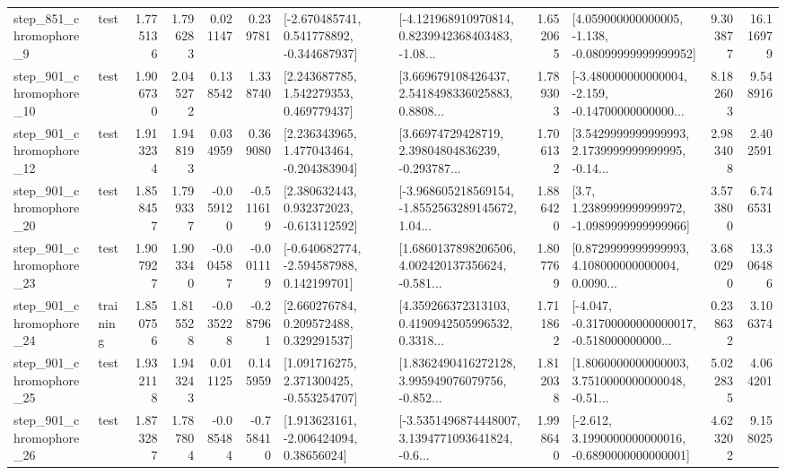 \begin{tabular}{llrrrrllrlrr}
   step\_851\_chromophore\_9 &      test &      1.775136 &    1.796283 &      0.021147 &  0.239781 &   [-2.670485741, 0.541778892, -0.344687937] &  [-4.121968910970814, 0.8239942368403483, -1.08... &       1.652065 &  [4.059000000000005, -1.138, -0.08099999999999952] &            9.303877 &         16.116979 \\
  step\_901\_chromophore\_10 &      test &      1.906730 &    2.045272 &      0.138542 &  1.338740 &     [2.243687785, 1.542279353, 0.469779437] &  [3.669679108426437, 2.5418498336025883, 0.8808... &       1.789303 &  [-3.480000000000004, -2.159, -0.14700000000000... &            8.182603 &          9.548916 \\
  step\_901\_chromophore\_12 &      test &      1.913234 &    1.948193 &      0.034959 &  0.369080 &    [2.236343965, 1.477043464, -0.204383904] &  [3.66974729428719, 2.39804804836239, -0.293787... &       1.706132 &  [3.5429999999999993, 2.1739999999999995, -0.14... &            2.983408 &          2.402591 \\
  step\_901\_chromophore\_20 &      test &      1.858457 &    1.799337 &     -0.059120 & -0.511619 &    [2.380632443, 0.932372023, -0.613112592] &  [-3.968605218569154, -1.8552563289145672, 1.04... &       1.886420 &     [3.7, 1.2389999999999972, -1.0989999999999966] &            3.573800 &          6.746531 \\
  step\_901\_chromophore\_23 &      test &      1.907927 &    1.903340 &     -0.004587 & -0.001119 &   [-0.640682774, -2.594587988, 0.142199701] &  [1.6860137898206506, 4.002420137356624, -0.581... &       1.807769 &  [0.8729999999999993, 4.108000000000004, 0.0090... &            3.680290 &         13.306486 \\
  step\_901\_chromophore\_24 &  training &      1.850756 &    1.815528 &     -0.035228 & -0.287961 &     [2.660276784, 0.209572488, 0.329291537] &  [4.359266372313103, 0.4190942505996532, 0.3318... &       1.711862 &  [-4.047, -0.31700000000000017, -0.518000000000... &            0.238632 &          3.106374 \\
  step\_901\_chromophore\_25 &      test &      1.932118 &    1.943243 &      0.011125 &  0.145959 &    [1.091716275, 2.371300425, -0.553254707] &  [1.8362490416272128, 3.995949076079756, -0.852... &       1.812038 &  [1.8060000000000003, 3.7510000000000048, -0.51... &            5.022835 &          4.064201 \\
  step\_901\_chromophore\_26 &      test &      1.873287 &    1.787804 &     -0.085484 & -0.758410 &     [1.913623161, -2.006424094, 0.38656024] &  [-3.5351496874448007, 3.1394771093641824, -0.6... &       1.998640 &  [-2.612, 3.1990000000000016, -0.6890000000000001] &            4.623202 &          9.158025 \\

\end{tabular}
